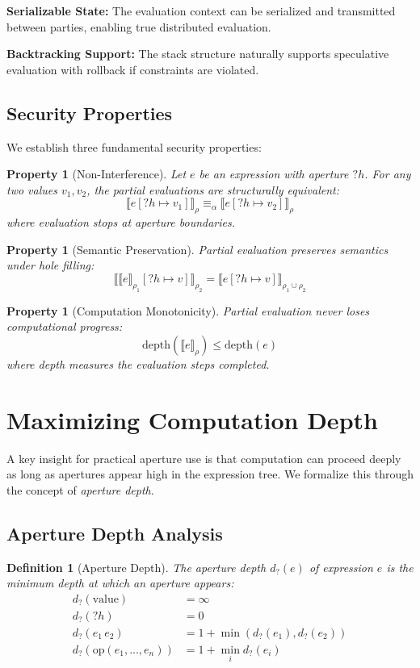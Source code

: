 \documentclass[12pt]{article}
\newtheorem{definition}[theorem]{Definition}
\newtheorem{property}[theorem]{Property}
\begin{document}
\textbf{Serializable State:} The evaluation context can be serialized and transmitted between parties, enabling true distributed evaluation.

\textbf{Backtracking Support:} The stack structure naturally supports speculative evaluation with rollback if constraints are violated.

\subsection{Security Properties}

We establish three fundamental security properties:

\begin{property}[Non-Interference]
Let $e$ be an expression with aperture $?h$. For any two values $v_1, v_2$, the partial evaluations are structurally equivalent:
$$\llbracket e[?h \mapsto v_1] \rrbracket_\rho \equiv_\alpha \llbracket e[?h \mapsto v_2] \rrbracket_\rho$$
where evaluation stops at aperture boundaries.
\end{property}

\begin{property}[Semantic Preservation]
Partial evaluation preserves semantics under hole filling:
$$\llbracket \llbracket e \rrbracket_{\rho_1}[?h \mapsto v] \rrbracket_{\rho_2} = \llbracket e[?h \mapsto v] \rrbracket_{\rho_1 \cup \rho_2}$$
\end{property}

\begin{property}[Computation Monotonicity]
Partial evaluation never loses computational progress:
$$\text{depth}(\llbracket e \rrbracket_\rho) \leq \text{depth}(e)$$
where depth measures the evaluation steps completed.
\end{property}

\section{Maximizing Computation Depth}

A key insight for practical aperture use is that computation can proceed deeply as long as apertures appear high in the expression tree. We formalize this through the concept of \textit{aperture depth}.

\subsection{Aperture Depth Analysis}

\begin{definition}[Aperture Depth]
The aperture depth $d_?(e)$ of expression $e$ is the minimum depth at which an aperture appears:
\begin{align}
d_?(\text{value}) &= \infty \\
d_?(?h) &= 0 \\
d_?(e_1 \, e_2) &= 1 + \min(d_?(e_1), d_?(e_2)) \\
d_?(\text{op}(e_1, ..., e_n)) &= 1 + \min_{i} d_?(e_i)
\end{align}
\end{definition}
\end{document}
